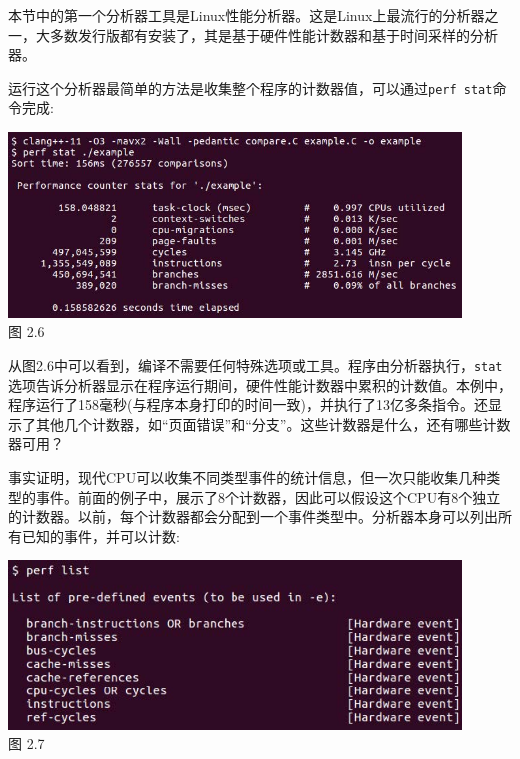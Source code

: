 本节中的第一个分析器工具是Linux性能分析器。这是Linux上最流行的分析器之一，大多数发行版都有安装了，其是基于硬件性能计数器和基于时间采样的分析器。

运行这个分析器最简单的方法是收集整个程序的计数器值，可以通过\texttt{perf stat}命令完成:

\begin{center}
\includegraphics[width=0.9\textwidth]{content/1/chapter2/images/6.jpg}\\
图 2.6
\end{center}

从图2.6中可以看到，编译不需要任何特殊选项或工具。程序由分析器执行，\texttt{stat}选项告诉分析器显示在程序运行期间，硬件性能计数器中累积的计数值。本例中，程序运行了158毫秒(与程序本身打印的时间一致)，并执行了13亿多条指令。还显示了其他几个计数器，如“页面错误”和“分支”。这些计数器是什么，还有哪些计数器可用？

事实证明，现代CPU可以收集不同类型事件的统计信息，但一次只能收集几种类型的事件。前面的例子中，展示了8个计数器，因此可以假设这个CPU有8个独立的计数器。以前，每个计数器都会分配到一个事件类型中。分析器本身可以列出所有已知的事件，并可以计数:

\begin{center}
\includegraphics[width=0.9\textwidth]{content/1/chapter2/images/7.jpg}\\
图 2.7
\end{center}

